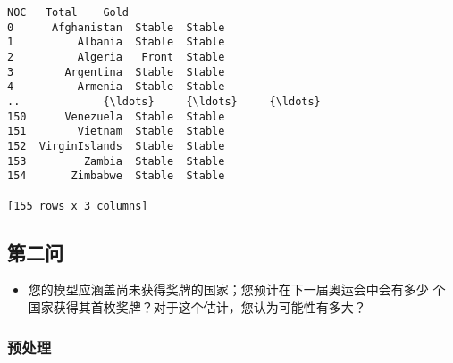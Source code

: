 \documentclass[11pt]{article}
\providecommand{\tightlist}{%
      \setlength{\itemsep}{0pt}\setlength{\parskip}{0pt}}
\begin{document}
    \begin{Verbatim}[commandchars=\\\{\}]
               NOC   Total    Gold
0      Afghanistan  Stable  Stable
1          Albania  Stable  Stable
2          Algeria   Front  Stable
3        Argentina  Stable  Stable
4          Armenia  Stable  Stable
..             {\ldots}     {\ldots}     {\ldots}
150      Venezuela  Stable  Stable
151        Vietnam  Stable  Stable
152  VirginIslands  Stable  Stable
153         Zambia  Stable  Stable
154       Zimbabwe  Stable  Stable

[155 rows x 3 columns]
    \end{Verbatim}

    \subsection{第二问}\label{ux7b2cux4e8cux95ee}

    \begin{itemize}
\tightlist
\item
  您的模型应涵盖尚未获得奖牌的国家；您预计在下一届奥运会中会有多少
  个国家获得其首枚奖牌？对于这个估计，您认为可能性有多大？
\end{itemize}

    \subsubsection{预处理}\label{ux9884ux5904ux7406}
\end{document}
